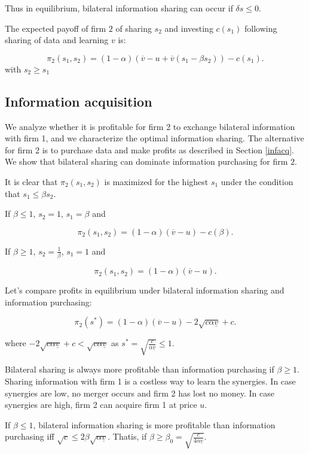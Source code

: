 \documentclass[a4paper,leqno]{article}%
\renewcommand{\a}{\alpha}
\newcommand{\uv}{\underline{v}}
\newcommand{\ov}{\overline{v}}
\begin{document}
Thus in equilibrium, bilateral information sharing can occur if $\delta s\leq0$.

The expected payoff of firm $2$ of sharing $s_2$ and investing $c(s_1)$ following sharing of data and learning $v$ is:


        $$\pi_2(s_1,s_2)=(1-\a)(\ov-u+\ov (s_1-\beta s_2))-c(s_1).$$
with $s_2\geq s_1$

\medskip
\subsection{Information acquisition}

We analyze whether it is profitable for firm 2 to exchange bilateral information with firm 1, and we characterize the optimal information sharing. The alternative for firm 2 is to purchase data and make profits as described in Section \ref{infacq}. We show that bilateral sharing can dominate information purchasing for firm $2$. 

\medskip

It is clear that $\pi_2(s_1,s_2)$ is maximized for the highest $s_1$ under the condition that $s_1\leq \beta s_2$. 


If $\beta\leq 1$, $s_2=1$, $s_1=\beta$ and

        $$\pi_2(s_1,s_2)=(1-\a)(\ov-u)-c(\beta).$$

If $\beta\geq 1$, $s_2=\frac{1}{\beta}$, $s_1=1$ and

        $$\pi_2(s_1,s_2)=(1-\a)(\ov-u).$$

\medskip

Let's compare profits in equilibrium under bilateral information sharing and information purchasing:

$$\pi_2(s^*)=(1-\a)(\ov-u)-2\sqrt{c\a \uv}+c.$$

where $-2\sqrt{c\a \uv}+c<\sqrt{c\a \uv}$ as $s^*=\sqrt{\frac{c}{\a\uv}}\leq 1$.

Bilateral sharing is always more profitable than information purchasing if $\beta\geq1$. Sharing information with firm 1 is a costless way to learn the synergies. In case synergies are low, no merger occurs and firm 2 has lost no money. In case synergies are high, firm 2 can acquire firm 1 at price $u$.

\medskip

If $\beta\leq1$, bilateral information sharing is more profitable than information purchasing iff $\sqrt{c}\leq 2\beta \sqrt{\a \uv}$. Thatis, if $\beta\geq\beta_0=\sqrt{\frac{c}{4\a \uv}}$.
\end{document}
